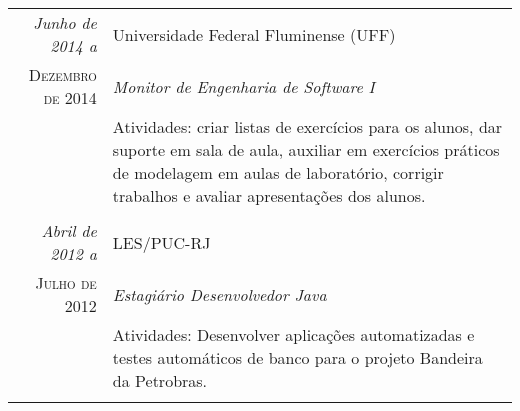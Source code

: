 \documentclass[a4paper,10pt]{article}
\begin{document}
\begin{tabular}{r|p{11cm}}
 \emph{Junho de 2014 a} & Universidade Federal Fluminense (UFF) \\
 \textsc{Dezembro de 2014}&\emph{Monitor de Engenharia de Software I}\\
 &\footnotesize{Atividades: criar listas de exercícios para os alunos, dar suporte em sala de aula, auxiliar em exercícios práticos de modelagem em aulas de laboratório, corrigir trabalhos e avaliar apresentações dos alunos.}\\
 
  & \\
 
 \emph{Abril de 2012 a} & LES/PUC-RJ \\
 \textsc{Julho de 2012}&\emph{Estagiário Desenvolvedor Java}\\
 &\footnotesize{Atividades: Desenvolver aplicações automatizadas e testes automáticos de banco para o projeto Bandeira da Petrobras.}\\
 
 \multicolumn{2}{c}{} \end{tabular}
 
\end{document}
